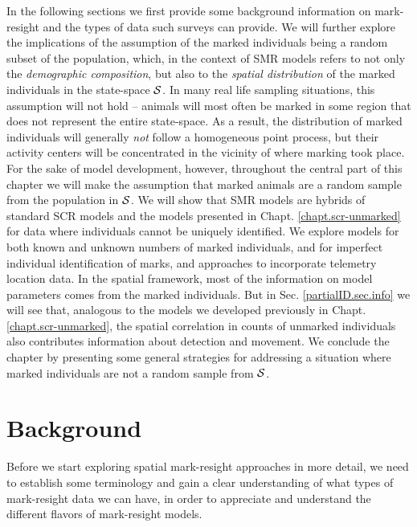 In the following sections we first provide some background
information on mark-resight and the types of data such surveys can
provide. We will further explore the implications of the assumption of
the marked individuals being a random subset of the population, which,
in the context of SMR models refers to not only the \emph{demographic
  composition}, but also to the \emph{spatial distribution} of the
marked individuals in the state-space ${\cal S}$.
In many real life sampling situations, this assumption will not hold
-- animals will most often be marked in some region that does not
represent the entire state-space. As a result, the distribution of
marked individuals will generally \emph{not} follow a homogeneous point process,
but their activity centers will be concentrated in the vicinity of
where marking took place. 
For the sake of model development, however, throughout the central part of this chapter we will make the assumption that marked animals are a random sample from the population in ${\cal S}$. We will show that SMR models are hybrids of standard SCR models and the models
presented in Chapt. \ref{chapt.scr-unmarked} for data where
individuals cannot be uniquely identified. We explore models for both
known and unknown numbers of marked individuals, and for imperfect
individual identification of marks, and approaches to incorporate
telemetry location data. In the spatial framework, most of the
information on model parameters comes from the marked individuals. But
in Sec. \ref{partialID.sec.info} we will see that, analogous to the
models we developed previously in Chapt. \ref{chapt.scr-unmarked}, the
spatial correlation in counts of unmarked individuals also contributes
information about detection and movement.
We conclude the chapter by presenting some general strategies for addressing a situation where marked individuals are not a random sample from ${\cal S}$.


\section{Background}

Before we start exploring spatial mark-resight approaches in more
detail, we need to establish some terminology and gain a clear
understanding of what types of mark-resight data we can have, in order
to appreciate and understand the different flavors of mark-resight
models.


